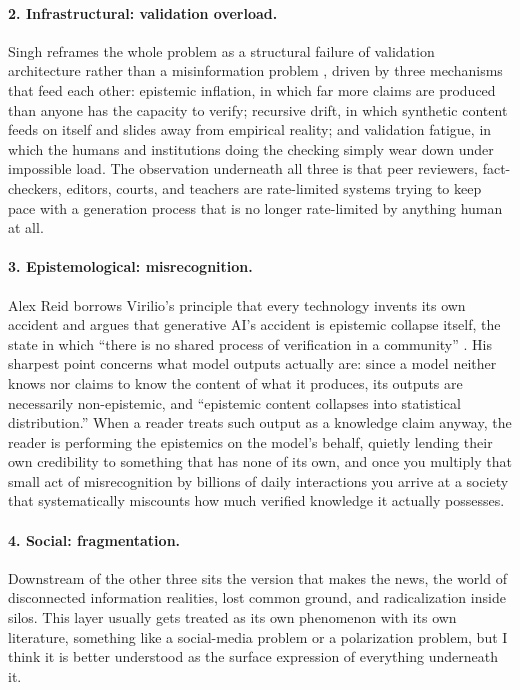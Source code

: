 \documentclass[11pt,letterpaper]{article}
\begin{document}
\paragraph{2. Infrastructural: validation overload.}
Singh reframes the whole problem as a structural failure of validation architecture rather than a misinformation problem \citep{singh}, driven by three mechanisms that feed each other: epistemic inflation, in which far more claims are produced than anyone has the capacity to verify; recursive drift, in which synthetic content feeds on itself and slides away from empirical reality; and validation fatigue, in which the humans and institutions doing the checking simply wear down under impossible load. The observation underneath all three is that peer reviewers, fact-checkers, editors, courts, and teachers are rate-limited systems trying to keep pace with a generation process that is no longer rate-limited by anything human at all.

\paragraph{3. Epistemological: misrecognition.}
Alex Reid borrows Virilio's principle that every technology invents its own accident and argues that generative AI's accident is epistemic collapse itself, the state in which ``there is no shared process of verification in a community'' \citep{reid}. His sharpest point concerns what model outputs actually are: since a model neither knows nor claims to know the content of what it produces, its outputs are necessarily non-epistemic, and ``epistemic content collapses into statistical distribution.'' When a reader treats such output as a knowledge claim anyway, the reader is performing the epistemics on the model's behalf, quietly lending their own credibility to something that has none of its own, and once you multiply that small act of misrecognition by billions of daily interactions you arrive at a society that systematically miscounts how much verified knowledge it actually possesses.

\paragraph{4. Social: fragmentation.}
Downstream of the other three sits the version that makes the news, the world of disconnected information realities, lost common ground, and radicalization inside silos. This layer usually gets treated as its own phenomenon with its own literature, something like a social-media problem or a polarization problem, but I think it is better understood as the surface expression of everything underneath it.
\end{document}
